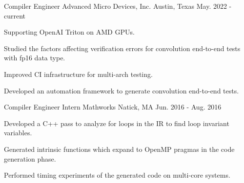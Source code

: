 

\begin{cventries}

  \cventry
    {Compiler Engineer} %
    {Advanced Micro Devices, Inc.} %
    {Austin, Texas} %
    {May. 2022 - current} %
    {
      \begin{cvitems} %
      \item {Supporting OpenAI Triton on AMD GPUs.}
      \item {Studied the factors affecting verification errors for convolution end-to-end tests with fp16 data type.}
      \item {Improved CI infrastructure for multi-arch testing.}
      \item {Developed an automation framework to generate convolution end-to-end tests.}
      \end{cvitems}
    }

  \cventry
    {Compiler Engineer Intern} %
    {Mathworks} %
    {Natick, MA} %
    {Jun. 2016 - Aug. 2016} %
    {
      \begin{cvitems} %
      \item Developed a C++ pass to analyze for loops in the IR to find loop invariant
        variables.
      \item Generated intrinsic functions which expand to OpenMP pragmas in the code
        generation phase.
      \item Performed timing experiments of the generated code on multi-core systems.
      \end{cvitems}
    }

\end{cventries}
